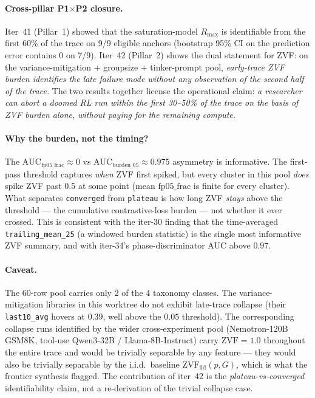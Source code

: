 \documentclass{article}
\begin{document}
\paragraph{Cross-pillar P1$\times$P2 closure.}
Iter~41 (Pillar~1) showed that the saturation-model $R_{\max}$ is
identifiable from the first 60\% of the trace on 9/9 eligible anchors
(bootstrap 95\% CI on the prediction error contains 0 on 7/9). Iter~42
(Pillar~2) shows the dual statement for ZVF: on the
variance-mitigation + groupsize + tinker-prompt pool,
\emph{early-trace ZVF burden identifies the late failure mode without
any observation of the second half of the trace.} The two results
together license the operational claim: \emph{a researcher can
abort a doomed RL run within the first 30--50\% of the trace on the
basis of ZVF burden alone, without paying for the remaining compute.}

\paragraph{Why the burden, not the timing?}
The $\mathrm{AUC}_{\mathrm{fp05\_frac}} \approx 0$ vs
$\mathrm{AUC}_{\mathrm{burden\_05}} \approx 0.975$ asymmetry is
informative. The first-pass threshold captures \emph{when} ZVF first
spiked, but every cluster in this pool \emph{does} spike ZVF past
0.5 at some point (mean $\mathrm{fp05\_frac}$ is finite for every
cluster). What separates \texttt{converged} from \texttt{plateau} is
how long ZVF \emph{stays} above the threshold — the cumulative
contrastive-loss burden — not whether it ever crossed. This is
consistent with the iter-30 finding that the time-averaged
\texttt{trailing\_mean\_25} (a windowed burden statistic) is the
single most informative ZVF summary, and with iter-34's
phase-discriminator AUC above $0.97$.

\paragraph{Caveat.}
The 60-row pool carries only 2 of the 4 taxonomy classes. The
variance-mitigation libraries in this worktree do not exhibit
late-trace collapse (their \texttt{last10\_avg} hovers at $0.39$,
well above the $0.05$ threshold). The corresponding collapse runs
identified by the wider cross-experiment pool (Nemotron-120B GSM8K,
tool-use Qwen3-32B / Llama-8B-Instruct) carry $\mathrm{ZVF}{=}1.0$
throughout the entire trace and would be trivially separable by any
feature — they would also be trivially separable by the i.i.d.\
baseline $\mathrm{ZVF}_{\mathrm{iid}}(p,G)$, which is what the
frontier synthesis flagged. The contribution of iter~42 is the
\emph{plateau-vs-converged} identifiability claim, not a re-derivation
of the trivial collapse case.
\end{document}
